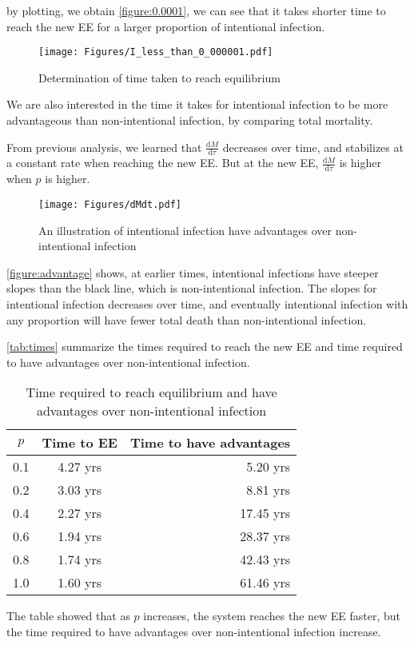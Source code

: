 \documentclass[12pt]{article}
\newcommand\dbyd[2]{\frac{\mathrm d{#1}}{\mathrm d{#2}}}
\begin{document}
by plotting, we obtain \autoref{figure:0.0001}, we can see that it takes shorter time to reach the new EE for a larger proportion of intentional infection.
\begin{figure}[h]
  \centering
  \texttt{[image: Figures/I\_less\_than\_0\_000001.pdf]}
  \caption{Determination of time taken to reach equilibrium}
\label{figure:0.0001}
\end{figure}

We are also interested in the time it takes for intentional infection to be more advantageous than non-intentional infection, by comparing total mortality.

From previous analysis, we learned that $\dbyd{M}{\tau}$ decreases over time, and stabilizes at a constant rate when reaching the new EE. But at the new EE, $\dbyd{M}{\tau}$ is higher when $p$ is higher. 

\begin{figure}[H]
  \centering
  \texttt{[image: Figures/dMdt.pdf]}
  \caption{An illustration of intentional infection have advantages over non-intentional infection}
\label{figure:advantage}
\end{figure}

\autoref{figure:advantage} shows, at earlier times, intentional infections have steeper slopes than the black line, which is non-intentional infection. The slopes for intentional infection decreases over time, and eventually intentional infection with any proportion will have fewer total death than non-intentional infection.

\autoref{tab:times} summarize the times required to reach the new EE and time required to have advantages over non-intentional infection.

\begin{table}[H]
\begin{center}
\caption{Time required to reach equilibrium and have advantages over non-intentional infection}
\label{tab:times}
\smallskip
\begin{tabular}{c|c|r}
{\bfseries $p$} & {\bfseries Time to EE} & {\bfseries Time to have advantages} \\\hline
0.1 & 4.27 yrs & 5.20 yrs \\
0.2 & 3.03 yrs & 8.81 yrs \\
0.4 & 2.27 yrs & 17.45 yrs \\
0.6 & 1.94 yrs & 28.37 yrs \\
0.8 & 1.74 yrs & 42.43 yrs \\
1.0 & 1.60 yrs & 61.46 yrs
\end{tabular}
\end{center}
\end{table}
The table showed that as $p$ increases, the system reaches the new EE faster, but the time required to have advantages over non-intentional infection increase.
\end{document}
